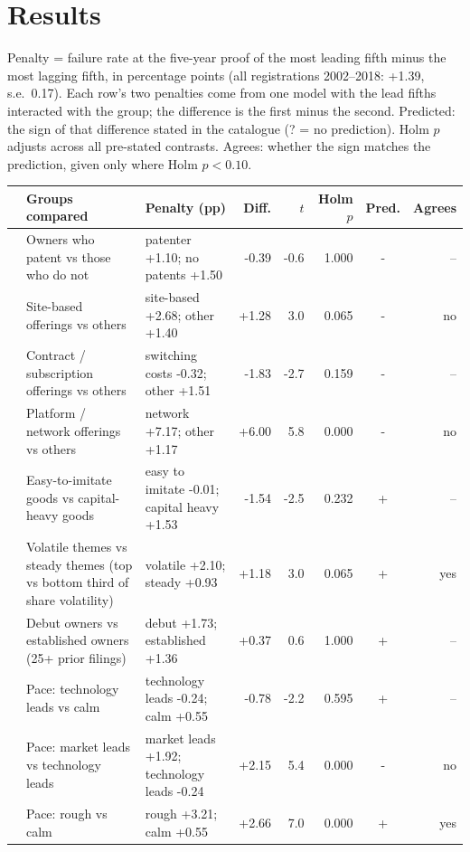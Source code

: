 \section*{Results}
Penalty = failure rate at the five-year proof of the most leading fifth minus the most lagging fifth, in percentage points (all registrations 2002--2018: +1.39, s.e.\ 0.17). Each row's two penalties come from one model with the lead fifths interacted with the group; the difference is the first minus the second. Predicted: the sign of that difference stated in the catalogue (? = no prediction). Holm $p$ adjusts across all pre-stated contrasts. Agrees: whether the sign matches the prediction, given only where Holm $p < 0.10$.

{\small
\begin{longtable}{>{\raggedright\arraybackslash}p{0.7cm}>{\raggedright\arraybackslash}p{4.6cm}>{\raggedright\arraybackslash}p{2.9cm}rrrcr}
\toprule & Groups compared & Penalty (pp) & Diff. & $t$ & Holm $p$ & Pred. & Agrees \\ \midrule \endhead
1 & Owners who patent vs those who do not & patenter +1.10; no patents +1.50 & -0.39 & -0.6 & 1.000 & - & -- \\
2 & Site-based offerings vs others & site-based +2.68; other +1.40 & +1.28 & 3.0 & 0.065 & - & no \\
3 & Contract / subscription offerings vs others & switching costs -0.32; other +1.51 & -1.83 & -2.7 & 0.159 & - & -- \\
4 & Platform / network offerings vs others & network +7.17; other +1.17 & +6.00 & 5.8 & 0.000 & - & no \\
5 & Easy-to-imitate goods vs capital-heavy goods & easy to imitate -0.01; capital heavy +1.53 & -1.54 & -2.5 & 0.232 & + & -- \\
6 & Volatile themes vs steady themes (top vs bottom third of share volatility) & volatile +2.10; steady +0.93 & +1.18 & 3.0 & 0.065 & + & yes \\
7 & Debut owners vs established owners (25+ prior filings) & debut +1.73; established +1.36 & +0.37 & 0.6 & 1.000 & + & -- \\
8 & Pace: technology leads vs calm & technology leads -0.24; calm +0.55 & -0.78 & -2.2 & 0.595 & + & -- \\
10 & Pace: market leads vs technology leads & market leads +1.92; technology leads -0.24 & +2.15 & 5.4 & 0.000 & - & no \\
11 & Pace: rough vs calm & rough +3.21; calm +0.55 & +2.66 & 7.0 & 0.000 & + & yes \\

\end{longtable}}
